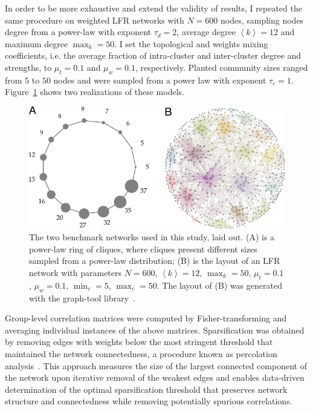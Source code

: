 In order to be more exhaustive and extend the validity of results, I repeated the same procedure on weighted LFR networks with $N=600$ nodes, sampling nodes degree from a power-law with exponent $\tau_d=2$, average degree $\left<k\right>=12$ and maximum degree $\max_k=50$.
I set the topological and weights mixing coefficients, i.e. the average fraction of intra-cluster and inter-cluster degree and strengths, to $\mu_t=0.1$ and $\mu_w=0.1$, respectively.
Planted community sizes ranged from $5$ to $50$ nodes and were sampled from a power law with exponent $\tau_c=1$.
Figure~\ref{fig:lfrringclique} shows two realizations of these models.

\begin{figure}[!htb]
\centering
\includegraphics[width=1\textwidth]{images/pacopaperfigure1.pdf}
\caption{The two benchmark networks used in this study, laid out. (A) is a power-law ring of cliques, where cliques present different sizes sampled from a power-law distribution;
(B) is the layout of an LFR network with parameters $N=600$, $\left< k \right>=12$, $\max_k=50$, $\mu_t=0.1$, $\mu_w=0.1$, $\min_c=5$, $\max_c=50$.
The layout of (B) was generated with the graph-tool library~\cite{peixoto_graph_tool_2014}.}
\label{fig:lfrringclique}
\end{figure}

Group-level correlation matrices were computed by Fisher-transforming and averaging individual instances of the above matrices.
Sparsification was obtained by removing edges with weights below the most stringent threshold that maintained the network connectedness, a procedure known as percolation analysis~\cite{gallos2012,bardella2016a,alexander-bloch2010}.
This approach measures the size of the largest connected component of the network upon iterative removal of the weakest edges and enables data-driven determination of the optimal sparsification threshold that preserves network structure and connectedness while removing potentially spurious correlations.

